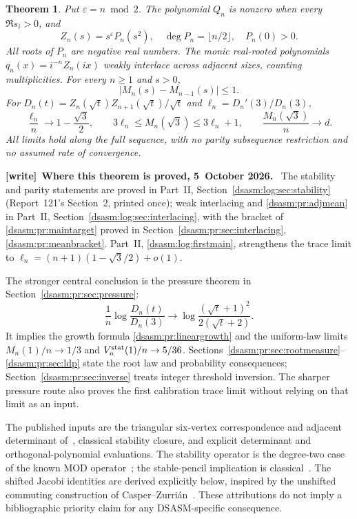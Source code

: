 \documentclass[11pt,letterpaper]{article}
\newtheorem{theorem}{Theorem}[section]
\theoremstyle{remark}\newtheorem{remark}[theorem]{Remark}
\newcommand{\eps}{\varepsilon}\newcommand{\HH}{\mathcal H}\newcommand{\one}{\mathbf1}
\newenvironment{writenote}[1][]{\par\smallskip\begingroup\small
 \noindent\textbf{[write]}\if\relax\detokenize{#1}\relax\else~\textbf{#1.}\fi\ }%
 {\par\endgroup\smallskip}
\begin{document}
\begin{theorem}\label{dsasm:pr:main}
Put $\eps=n\bmod2$. The polynomial $Q_n$ is nonzero when every
$\Re s_i>0$, and
\begin{equation}\label{dsasm:pr:paritypoly}
Z_n(s)=s^\eps P_n(s^2),\quad
\deg P_n=\lfloor n/2\rfloor,\quad P_n(0)>0.
\end{equation}
All roots of $P_n$ are negative real numbers. The monic real-rooted
polynomials $q_n(x)=i^{-n}Z_n(ix)$ weakly interlace across adjacent
sizes, counting multiplicities. For every $n\ge1$ and $s>0$,
\begin{equation}\label{dsasm:pr:adjmean}
 |M_n(s)-M_{n-1}(s)|\le1.
\end{equation}
For $D_n(t)=Z_n(\sqrt t)Z_{n+1}(\sqrt t)/\sqrt t$ and
$\ell_n=D_n'(3)/D_n(3)$,
\begin{equation}\label{dsasm:pr:maintarget}
\frac{\ell_n}{n}\longrightarrow1-\frac{\sqrt3}{2},\qquad
3\ell_n\le M_n(\sqrt3)\le3\ell_n+1,\qquad
\frac{M_n(\sqrt3)}n\longrightarrow d.
\end{equation}
All limits hold along the full sequence, with no parity subsequence
restriction and no assumed rate of convergence.
\end{theorem}
\begin{writenote}[Where this theorem is proved, 5~October 2026]
The stability and parity statements are proved in Part~II, Section~\ref{dsasm:log:sec:stability} (Report~121's Section~2, printed once); weak interlacing and \eqref{dsasm:pr:adjmean} in Part~II, Section~\ref{dsasm:log:sec:interlacing}, with the bracket of \eqref{dsasm:pr:maintarget} proved in Section~\ref{dsasm:pr:sec:interlacing}, \eqref{dsasm:pr:meanbracket}. Part~II, \eqref{dsasm:log:firstmain}, strengthens the trace limit to $\ell_n=(n+1)(1-\sqrt3/2)+o(1)$.
\end{writenote}


The stronger central conclusion is the pressure theorem in
Section~\ref{dsasm:pr:sec:pressure}:
\[
 \frac1n\log\frac{D_n(t)}{D_n(3)}
 \longrightarrow\log\frac{(\sqrt t+1)^2}{2(\sqrt t+2)}.
\]
It implies the growth formula \eqref{dsasm:pr:lineargrowth} and the uniform-law
limits $M_n(1)/n\to1/3$ and $V_n^{\rm stat}(1)/n\to5/36$.
Sections~\ref{dsasm:pr:sec:rootmeasure}--\ref{dsasm:pr:sec:ldp} state the root law and
probability consequences; Section~\ref{dsasm:pr:sec:inverse} treats integer
threshold inversion. The sharper pressure route also proves the
first calibration trace limit without relying on that limit as an input.


The published inputs are the triangular six-vertex correspondence
and adjacent determinant of~\cite{bfk}, classical stability closure,
and explicit determinant and orthogonal-polynomial evaluations.
The stability operator is the degree-two case of the known MOD
operator~\cite[Section 8.4]{bb2}; the stable-pencil implication is
classical~\cite[Definition 1.1 and Lemma 1.8]{bb1}.
The shifted Jacobi identities are derived explicitly below, inspired
by the unshifted commuting construction of Casper--Zurri\'an~\cite{cz}.
These attributions do not imply a bibliographic priority claim for
any DSASM-specific consequence.
\end{document}

